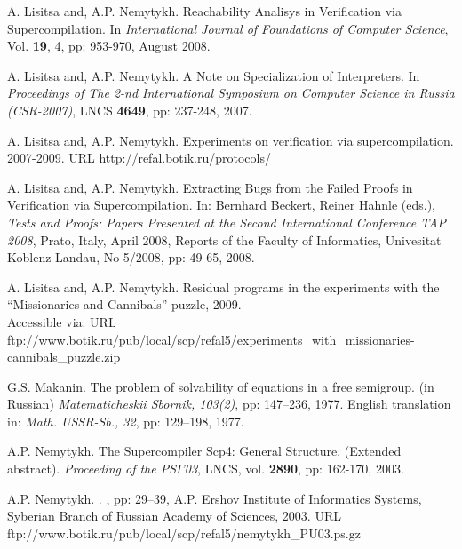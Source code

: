 \documentclass[preprint]{sigplanconf}
\newcommand{\url}{}
\begin{document}
\begin{thebibliography}{}
A. Lisitsa and, A.P. Nemytykh.
\newblock  Reachability Analisys in Verification via Supercompilation. 
\newblock In  \emph{International Journal of Foundations of Computer Science},  Vol. {\bfseries  19}, 4, pp: 953-970, August 2008.

A. Lisitsa and, A.P. Nemytykh.
        \newblock A Note on Specialization of Interpreters. 
        \newblock In 
        \emph{Proceedings of The 2-nd International Symposium on Computer Science 
        in Russia (CSR-2007)}, LNCS {\bfseries 4649}, pp: 237-248, 2007. 


A. Lisitsa and, A.P. Nemytykh.
  \newblock Experiments on verification via supercompilation. 2007-2009.   
  \newblock URL \url{http://refal.botik.ru/protocols/} 


A. Lisitsa and, A.P. Nemytykh.
\newblock Extracting Bugs from the Failed Proofs in Verification via Supercompilation. 
\newblock In: Bernhard Beckert, Reiner Hahnle (eds.), {\emph{ Tests and Proofs: Papers Presented at the Second International Conference TAP 2008}}, Prato, Italy, April 2008, Reports of the Faculty of Informatics, Univesitat Koblenz-Landau, No 5/2008, pp: 49-65, 2008.

A. Lisitsa and, A.P. Nemytykh.
   \newblock Residual programs in the experiments with the ``Missionaries and Cannibals'' puzzle, 2009.\\
       {Accessible via:
             \newblock URL\\
                   \url{ftp://www.botik.ru/pub/local/scp/refal5/experiments\_with\_missionaries-cannibals\_puzzle.zip}}
                   

G.S. Makanin.
        \newblock The problem of solvability of equations in a free semigroup. (in Russian)
        \newblock \emph{Matematicheskii Sbornik, 103(2)}, pp: 147--236, 1977. 
        \newblock English translation in: \emph{Math. USSR-Sb., 32}, pp: 129--198, 1977.


A.P. Nemytykh. 
\newblock The Supercompiler Scp4: General Structure. (Extended abstract).
\newblock \emph{Proceeding of the PSI'03}, LNCS, vol. {\bfseries 2890}, pp: 162-170, 2003.

A.P. Nemytykh. 
       .
       ,
       pp: 29--39, A.P. Ershov Institute of Informatics Systems, 
       Syberian Branch of Russian Academy of Sciences, 2003.  
       {\newblock URL \\
              \url{ftp://www.botik.ru/pub/local/scp/refal5/nemytykh\_PU03.ps.gz}}


\end{thebibliography}
\end{document}
